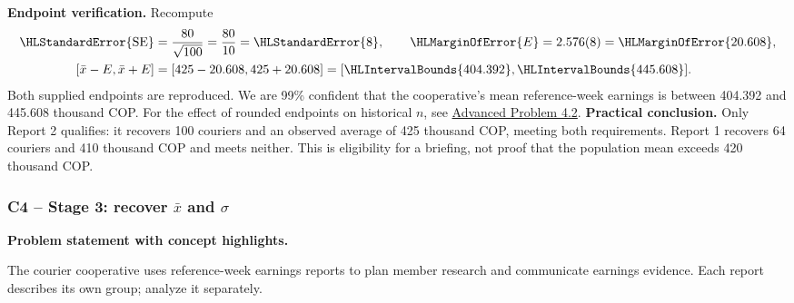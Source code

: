 \textbf{Endpoint verification.} Recompute
\[\begin{aligned}
\HLStandardError{\mathrm{SE}}&=\frac{80}{\sqrt{100}}=\frac{80}{10}=\HLStandardError{8},\qquad \HLMarginOfError{E}=2.576(8)=\HLMarginOfError{20.608},\\
[\bar x-E,\bar x+E]&=[425-20.608,425+20.608]=[\HLIntervalBounds{404.392},\HLIntervalBounds{445.608}].
\end{aligned}\]
Both supplied endpoints are reproduced. We are 99\% confident that the cooperative's mean reference-week earnings is between 404.392 and 445.608 thousand COP.
For the effect of rounded endpoints on historical $n$, see \hyperref[prob:c4-advanced-2]{Advanced Problem 4.2}.
\textbf{Practical conclusion.} Only Report 2 qualifies: it recovers 100 couriers and an observed average of 425 thousand COP, meeting both requirements. Report 1 recovers 64 couriers and 410 thousand COP and meets neither. This is eligibility for a briefing, not proof that the population mean exceeds 420 thousand COP.
\clearpage
\subsubsection*{C4 -- Stage 3: recover $\bar x$ and $\sigma$}\label{sol:c4-1-c}
\textbf{Problem statement with concept highlights.}
\begingroup\raggedright
The courier cooperative uses reference-week earnings reports to plan member research and communicate earnings evidence. Each report describes its own group; analyze it separately.

